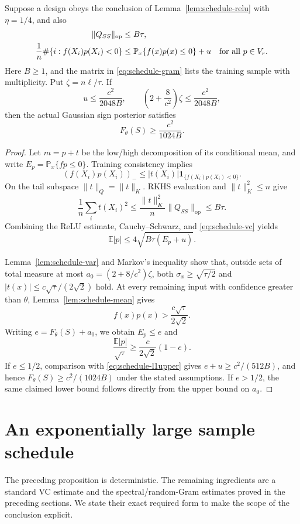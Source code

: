 \begin{proposition}
\label{prop:schedule-deterministic}
Suppose a design obeys the conclusion of Lemma~\ref{lem:schedule-relu}
with $\eta=1/4$, and also
\begin{align}
 \|Q_{SS}\|_{\mathrm{op}}&\le B\tau,\label{eq:schedule-gram}\\
 \frac1n\#\{i:f(X_i)p(X_i)<0\}
       &\le\mathbb P_x\{f(x)p(x)\le0\}+u
       \quad\hbox{for all }p\in V_r.\label{eq:schedule-vc}
\end{align}
Here $B\ge1$, and the matrix in \eqref{eq:schedule-gram} lists the training sample
with multiplicity. Put $\zeta=n\ell/\tau$. If
\[
 u\le\frac{c^2}{2048B},\qquad
 \left(2+\frac8{c^2}\right)\zeta\le\frac{c^2}{2048B},
\]
then the actual Gaussian sign posterior satisfies
\[
 F_\theta(S)\ge\frac{c^2}{1024B}.
\]
\end{proposition}
\begin{proof}
Let $m=p+t$ be the low/high decomposition of its conditional mean,
and write $E_p=\mathbb P_x\{fp\le0\}$. Training consistency implies
\[
 (f(X_i)p(X_i))_-\le|t(X_i)|\mathbf1_{\{f(X_i)p(X_i)<0\}}.
\]
On the tail subspace $\|t\|_Q=\|t\|_K$. RKHS evaluation and $\|t\|_K^2\le n$ give
\[
 \frac1n\sum_i t(X_i)^2
 \le\frac{\|t\|_K^2}{n}\|Q_{SS}\|_{\mathrm{op}}\le B\tau.
\]
Combining the ReLU estimate, Cauchy--Schwarz, and
\eqref{eq:schedule-vc} yields
\begin{equation}\label{eq:schedule-l1upper}
 \mathbb E|p|\le4\sqrt{B\tau(E_p+u)}.
\end{equation}

Lemma~\ref{lem:schedule-var} and Markov's inequality show that, outside
sets of total measure at most
$a_0=(2+8/c^2)\zeta$, both
$\sigma_x\ge\sqrt{\tau/2}$ and
$|t(x)|\le c\sqrt\tau/(2\sqrt2)$ hold. At every remaining input
with confidence greater than $\theta$, Lemma~\ref{lem:schedule-mean}
gives
\[
 f(x)p(x)>\frac{c\sqrt\tau}{2\sqrt2}.
\]
Writing $e=F_\theta(S)+a_0$, we obtain $E_p\le e$ and
\[
 \frac{\mathbb E|p|}{\sqrt\tau}
 \ge\frac c{2\sqrt2}(1-e).
\]
If $e\le1/2$, comparison with \eqref{eq:schedule-l1upper} gives
$e+u\ge c^2/(512B)$, and hence
$F_\theta(S)\ge c^2/(1024B)$ under the stated assumptions.
If $e>1/2$, the same claimed lower bound follows directly from the
upper bound on $a_0$.
\end{proof}

\section{An exponentially large sample schedule}
The preceding proposition is deterministic. The remaining ingredients
are a standard VC estimate and the spectral/random-Gram estimates proved
in the preceding sections. We state their exact required form to make
the scope of the conclusion explicit.

